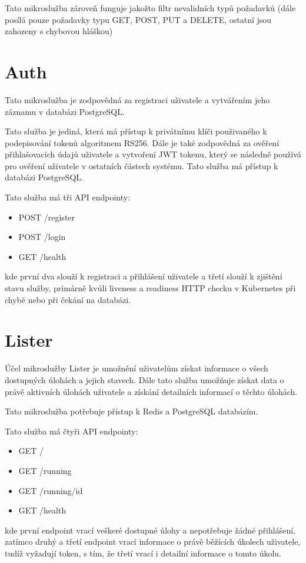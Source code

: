 \documentclass[12pt, a4paper,
twoside,        %
openright
]{report}
\begin{document}
Tato mikroslužba zároveň funguje jakožto filtr nevalidních typů požadavků (dále posílá pouze požadavky typu GET, POST, PUT a DELETE, ostatní jsou zahozeny s chybovou hláškou)

\section{Auth}
Tato mikroslužba je zodpovědná za registraci uživatele a vytvářením jeho záznamu v databázi PostgreSQL. 

Tato služba je jediná, která má přístup k privátnímu klíči použivaného k podepisování tokenů algoritmem RS256. Dále je také zodpovědná za ověření přihlašovacích údajů uživatele a vytvoření JWT tokenu, který se následně používá pro ověření uživatele v ostatních částech systému. Tato služba má přístup k databázi PostgreSQL.

Tato služba má tři API endpointy:
\begin{itemize}
	\item POST /register
	\item POST /login
	\item GET /health
\end{itemize}
kde první dva slouží k registraci a přihlášení uživatele a třetí slouží k zjištění stavu služby, primárně kvůli liveness a readiness HTTP checku v Kubernetes při chybě nebo při čekání na databázi.

\section{Lister}
Účel mikroslužby Lister je umožnění uživatelům získat informace o všech dostupných úlohách a jejich stavech. Dále tato služba umožňuje získat data o právě aktivních úlohách uživatele a získání detailních informací o těchto úlohách.

Tato mikroslužba potřebuje přístup k Redis a PostgreSQL databázím.

Tato služba má čtyři API endpointy:
\begin{itemize}
	\item GET /
	\item GET /running
	\item GET /running/{id}
	\item GET /health
\end{itemize}
kde první endpoint vrací veškeré dostupné úlohy a nepotřebuje žádné přihlášení, zatímco druhý a třetí endpoint vrací informace o právě běžících úkolech uživatele, tudíž vyžadují token, s tím, že třetí vrací i detailní informace o tomto úkolu.
\end{document}

